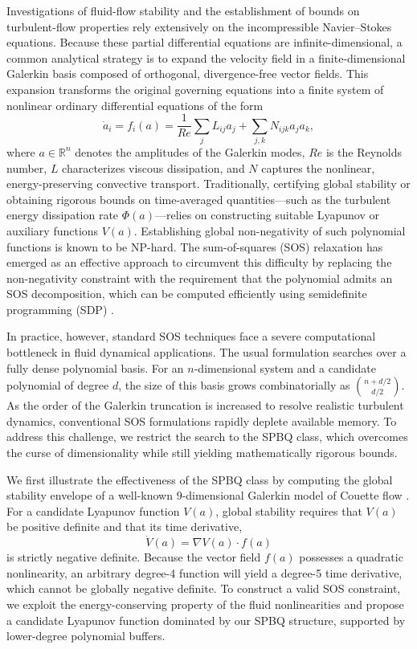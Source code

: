 \documentclass[12pt]{elsarticle}
\theoremstyle{definition}
\begin{document}
Investigations of fluid-flow stability and the establishment of bounds on turbulent-flow properties rely extensively on the incompressible Navier–Stokes equations. Because these partial differential equations are infinite-dimensional, a common analytical strategy is to expand the velocity field in a finite-dimensional Galerkin basis composed of orthogonal, divergence-free vector fields. This expansion transforms the original governing equations into a finite system of nonlinear ordinary differential equations of the form
\[
\dot{a}_i = f_i(a) = \frac{1}{Re} \sum_{j} L_{ij} a_j + \sum_{j,k} N_{ijk} a_j a_k,
\]
 where $a \in \mathbb{R}^n$ denotes the amplitudes of the Galerkin modes, $Re$ is the Reynolds number, $L$ characterizes viscous dissipation, and $N$ captures the nonlinear, energy-preserving convective transport. Traditionally, certifying global stability or obtaining rigorous bounds on time-averaged quantities—such as the turbulent energy dissipation rate $\Phi(a)$—relies on constructing suitable Lyapunov or auxiliary functions $V(a)$. Establishing global non-negativity of such polynomial functions is known to be NP-hard. The sum-of-squares (SOS) relaxation has emerged as an effective approach to circumvent this difficulty by replacing the non-negativity constraint with the requirement that the polynomial admits an SOS decomposition, which can be computed efficiently using semidefinite programming (SDP) \cite{chernyshenko2014polynomial}.

In practice, however, standard SOS techniques face a severe computational bottleneck in fluid dynamical applications. The usual formulation searches over a fully dense polynomial basis. For an $n$-dimensional system and a candidate polynomial of degree $d$, the size of this basis grows combinatorially as $\binom{n + d/2}{d/2}$. As the order of the Galerkin truncation is increased to resolve realistic turbulent dynamics, conventional SOS formulations rapidly deplete available memory. To address this challenge, we restrict the search to the SPBQ class, which overcomes the curse of dimensionality while still yielding mathematically rigorous bounds.

We first illustrate the effectiveness of the SPBQ class by computing the global stability envelope of a well-known $9$-dimensional Galerkin model of Couette flow \cite{moehlis2004low}. For a candidate Lyapunov function $V(a)$, global stability requires that $V(a)$ be positive definite and that its time derivative,
\[
\dot{V}(a) = \nabla V(a) \cdot f(a)
\]
is strictly negative definite. Because the vector field $f(a)$ possesses a quadratic nonlinearity, an arbitrary degree-4 function will yield a degree-5 time derivative, which cannot be globally negative definite. To construct a valid SOS constraint, we exploit the energy-conserving property of the fluid nonlinearities and propose a candidate Lyapunov function dominated by our SPBQ structure, supported by lower-degree polynomial buffers. 
\end{document}
